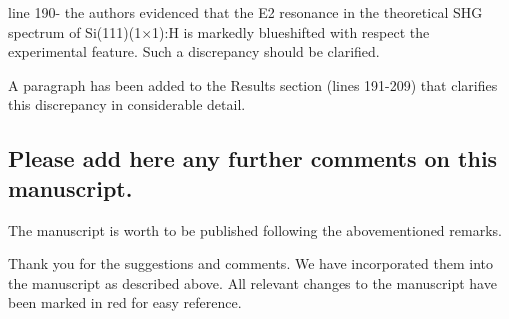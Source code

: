 \documentclass{article}
\begin{document}
line 190- the authors evidenced that the E2 resonance in the theoretical SHG
spectrum of Si(111)(1$\times$1):H is markedly blueshifted with respect the
experimental feature. Such a discrepancy should be clarified.

\begin{shaded}
A paragraph has been added to the Results section (lines 191-209) that clarifies this discrepancy in considerable detail.
\end{shaded}


\subsection{Please add here any further comments on this manuscript.}

The manuscript is worth to be published following the abovementioned remarks.

\begin{shaded}
Thank you for the suggestions and comments. We have incorporated them into the manuscript as described above. All relevant changes to the manuscript have been marked in red for easy reference. 
\end{shaded}
\end{document}
